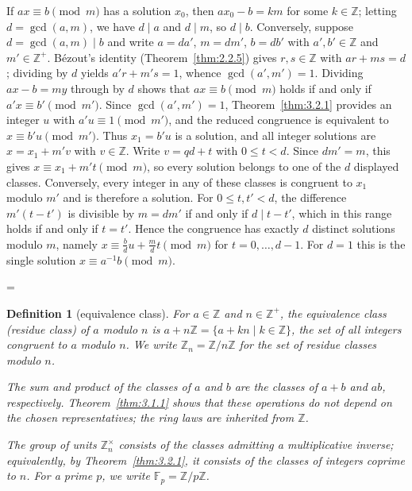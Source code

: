 \documentclass[11pt]{article}
\makeatletter
\theoremstyle{ntstyle}
\newtheorem{definition}{Definition}[subsection]
\let\nt@closedisplay\]
\def\nt@guardedclose{\@ifnextchar\par{\nt@closeafterpar}{\@ifnextchar\end{\postdisplaypenalty\@M\nt@closedisplay}{\nt@closedisplay}}}
\def\nt@closeafterpar\par{\@ifnextchar\par{\nt@closeafterpar}{\@ifnextchar\end{\postdisplaypenalty\@M\nt@closedisplay\par}{\nt@closedisplay\par}}}
\renewenvironment{proof}[1][\proofname]{\par
  \pushQED{\qed}\normalfont\topsep\medskipamount\edef\nt@afterproof{\@endparpenalty=\the\@endparpenalty\relax}\@beginparpenalty\@M\@endparpenalty\@M\let\]\nt@guardedclose\trivlist\item[]\textit{#1\@addpunct{.}} \ignorespaces}{\ifvmode\addpenalty\@M\fi\popQED\nt@afterproof\endtrivlist\@endpefalse}
\newcommand{\ZmodUnits}[1]{\mathbb{Z}_{#1}^{\times}}
\makeatother
\begin{document}
\begin{proof} If $ax \equiv b \pmod{m}$ has a solution
	$x_0$, then $ax_0 - b = km$ for some $k \in \mathbb{Z}$; letting $d =
		\gcd(a, m)$, we have $d \mid a$ and $d \mid m$, so $d \mid b$. Conversely,
	suppose $d = \gcd(a, m) \mid b$ and write $a = d a'$, $m = d m'$, $b =
		d b'$ with $a',b'\in\mathbb{Z}$ and $m'\in\mathbb{Z}^+$. B{\'e}zout's identity (Theorem~\ref{thm:2.2.5}) gives $r, s \in \mathbb{Z}$ with $a r + m s = d$;
	dividing by $d$ yields $a' r + m' s = 1$, whence $\gcd(a', m') = 1$.
	Dividing $ax - b = my$ through by $d$ shows that
	$ax \equiv b \pmod{m}$ holds if and only if $a' x \equiv b'
		\pmod{m'}$. Since $\gcd(a', m') = 1$, Theorem~\ref{thm:3.2.1} provides an integer
	$u$ with $a' u \equiv 1 \pmod{m'}$, and the reduced congruence is
	equivalent to $x \equiv b'u \pmod{m'}$. Thus $x_1=b'u$ is a solution,
	and all integer solutions are $x=x_1+m'v$ with $v\in\mathbb{Z}$.
	Write $v=qd+t$ with $0\le t<d$. Since $dm'=m$, this gives
	$x\equiv x_1+m't\pmod m$, so every solution belongs to one of the
	$d$ displayed classes. Conversely, every integer in any of these
	classes is congruent to $x_1$ modulo $m'$ and is therefore a solution.
	For $0\le t,t'<d$, the difference $m'(t-t')$ is divisible by
	$m=dm'$ if and only if $d\mid t-t'$, which in this range holds
	if and only if $t=t'$. Hence the congruence has exactly $d$ distinct
	solutions modulo $m$, namely
	$x\equiv\tfrac{b}{d}u+\tfrac{m}{d}t\pmod m$ for $t=0,\ldots,d-1$.
	For $d=1$ this is the single solution $x\equiv a^{-1}b\pmod m$.

\end{proof}
\begin{definition}[equivalence class]\label{def:3.2.2} For $a\in\mathbb{Z}$ and $n\in\mathbb{Z}^+$, the
	equivalence class (residue class) of $a$ modulo $n$ is
	$a+n\mathbb{Z}=\{a+kn\mid k\in\mathbb{Z}\}$, the set of all integers
	congruent to $a$ modulo $n$. We write $\mathbb{Z}_n=\mathbb{Z}/n\mathbb{Z}$
	for the set of residue classes modulo $n$.

	The sum and product of the classes of $a$ and $b$ are the classes of $a+b$ and $ab$, respectively.
	Theorem~\ref{thm:3.1.1} shows that these operations do not depend on the
	chosen representatives; the ring laws are inherited from $\mathbb{Z}$.

	The group of units $\ZmodUnits{n}$ consists of the classes admitting
	a multiplicative inverse; equivalently, by Theorem~\ref{thm:3.2.1},
	it consists of the classes of integers coprime to $n$. For a prime $p$, we write
	$\mathbb{F}_p=\mathbb{Z}/p\mathbb{Z}$.

\end{definition}
\end{document}
